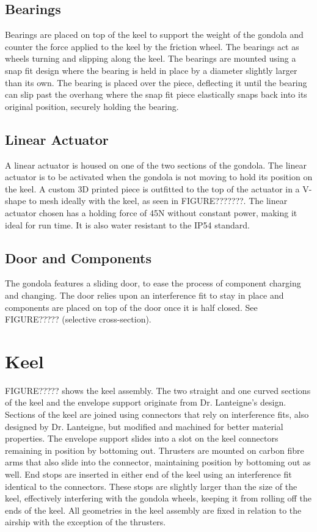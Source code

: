 \documentclass[../main.tex]{subfiles}
\begin{document}
\subsection{Bearings}
Bearings are placed on top of the keel to support the weight of the gondola and counter the force applied to the keel by the friction wheel. The bearings act as wheels turning and slipping along the keel. The bearings are mounted using a snap fit design where the bearing is held in place by a diameter slightly larger than its own. The bearing is placed over the piece, deflecting it until the bearing can slip past the overhang where the snap fit piece elastically snaps back into its original position, securely holding the bearing.
\\
\subsection{Linear Actuator}
A linear actuator is housed on one of the two sections of the gondola. The linear actuator is to be activated when the gondola is not moving to hold its position on the keel. A custom 3D printed piece is outfitted to the top of the actuator in a V-shape to mesh ideally with the keel, as seen in FIGURE???????. The  linear actuator chosen has a holding force of 45N without constant power, making it ideal for run time. It is also water resistant to the IP54 standard. 
\\
\subsection{Door and Components}
The gondola features a sliding door, to ease the process of component charging and changing. The door relies upon an interference fit to stay in place and components are placed on top of the door once it is half closed. See FIGURE????? (selective cross-section).
\\
\section{Keel}
FIGURE????? shows the keel assembly. The two straight and one curved sections of the keel and the envelope support originate from Dr. Lanteigne's design. Sections of the keel are joined using connectors that rely on interference fits, also designed by Dr. Lanteigne, but modified and machined for better material properties. The envelope support slides into a slot on the keel connectors remaining in position by bottoming out. Thrusters are mounted on carbon fibre arms that also slide into the connector, maintaining position by bottoming out as well. End stops are inserted in either end of the keel using an interference fit identical to the connectors. These stops are slightly larger than the size of the keel, effectively interfering with the gondola wheels, keeping it from rolling off the ends of the keel. All geometries in the keel assembly are fixed in relation to the airship with the exception of the thrusters.
\\
\end{document}
